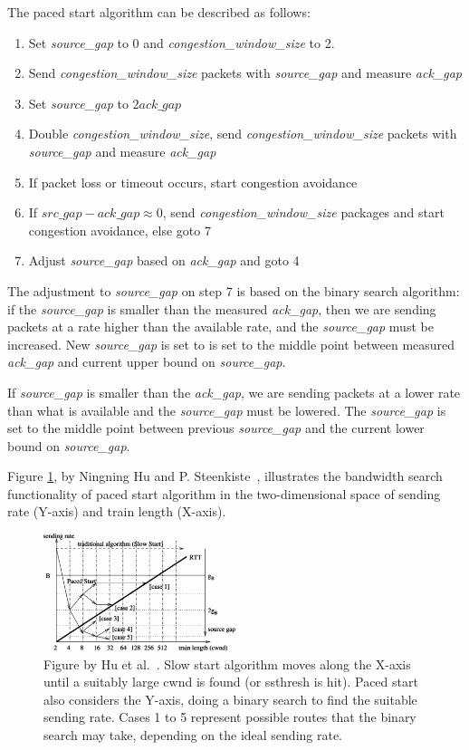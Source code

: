 The paced start algorithm can be described as follows:
\begin{enumerate}
	\item Set \textit{source\_gap} to 0 and \textit{congestion\_window\_size} to 2.
	\item Send \textit{congestion\_window\_size} packets with \textit{source\_gap} and measure \textit{ack\_gap}
	\item Set \textit{source\_gap} to $2 \textit{ack\_gap}$
	\item Double \textit{congestion\_window\_size}, send \textit{congestion\_window\_size} packets with \textit{source\_gap} and measure \textit{ack\_gap}
	\item If packet loss or timeout occurs, start congestion avoidance
	\item If $\textit{src\_gap} - \textit{ack\_gap} \approx 0$, send \textit{congestion\_window\_size} packages and start congestion avoidance, else goto 7
	\item Adjust \textit{source\_gap} based on \textit{ack\_gap} and goto 4 
\end{enumerate} 
The adjustment to \textit{source\_gap} on step 7 is based on the binary search algorithm: if the \textit{source\_gap} is smaller than the measured \textit{ack\_gap}, then we are sending packets at a rate higher than the available rate, and the \textit{source\_gap} must be increased. New \textit{source\_gap} is set to is set to the middle point between measured \textit{ack\_gap} and current upper bound on \textit{source\_gap}.

If \textit{source\_gap} is smaller than the \textit{ack\_gap}, we are sending packets at a lower rate than what is available and the \textit{source\_gap} must be lowered. The \textit{source\_gap} is set to the middle point between previous \textit{source\_gap} and the current lower bound on \textit{source\_gap}.

Figure \ref{fig:paced_start}, by Ningning Hu and P. Steenkiste~\cite{Hu03}, illustrates the bandwidth search functionality of paced start algorithm in the two-dimensional space of sending rate (Y-axis) and train length (X-axis).

\begin{figure}
	\includegraphics[width=0.5\textwidth]{images/hu03_paced_start_search.png}
	\caption{Figure by Hu et al.~\cite{Hu03}. Slow start algorithm moves along the X-axis until a suitably large cwnd is found (or ssthresh is hit). Paced start also considers the Y-axis, doing a binary search to find the suitable sending rate. Cases 1 to 5 represent possible routes that the binary search may take, depending on the ideal sending rate.}
	\label{fig:paced_start}
\end{figure}

